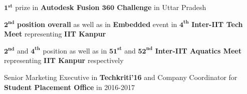 \begin{cventries}
  \cvsoloentry
    {
      \begin{cvitems}
        \item{$\bm{1^{st}}$ prize in \textbf{Autodesk Fusion $\textbf{360}$ Challenge} in Uttar Pradesh}
        \item{$\bm{2^{nd}}$ \textbf{position overall} as well as in \textbf{Embedded} event in $\bm{4^{th}}$ \textbf{Inter-IIT Tech Meet} representing \textbf{IIT Kanpur}}
        \item{$\bm{2^{nd}}$ and $\bm{4^{th}}$ position as well as in $\bm{51^{st}}$ and $\bm{52^{nd}}$ \textbf{Inter-IIT Aquatics Meet} representing \textbf{IIT Kanpur} respectively}
        \item{Senior Marketing Executive in \textbf{Techkriti'16} and Company Coordinator for \textbf{Student Placement Office} in 2016-2017}
      \end{cvitems}
    }
    
  
\end{cventries}
